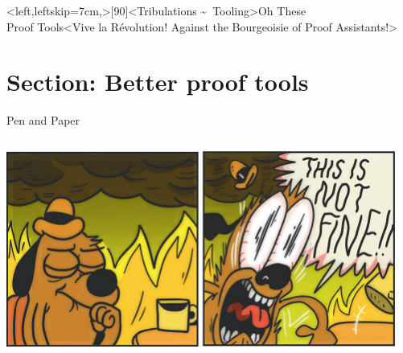 \interlude*<left,leftskip=7cm,>[90]<Tribulations \textasciitilde\ Tooling>{Oh These\\Proof Tools}<Vive la Révolution! Against the Bourgeoisie of Proof Assistants!>
\section{Section: Better proof tools}

\begin{frame}[T]{Pen and Paper}
  \begin{columns}[fullwidth,t]
    \begin{column}{.29\linewidth}
      \par\nointerlineskip
      \includegraphics[width=\linewidth]{graphics/this-is-not-fine-crop.jpg}%
    \end{column}
    \hfill
    \begin{column}{.68\linewidth}
      \small


\end{column}
\end{columns}
\end{frame}

